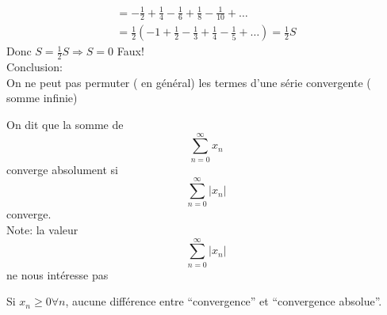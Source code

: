 \documentclass[../main.tex]{subfiles}
\begin{document}
\begin{align*}
= -\frac{1}{2} + \frac{1}{4} - \frac{1}{6} + \frac{1}{8} - \frac{1}{10}  + \ldots\\
= \frac{1}{2} ( -1 + \frac{1}{2} - \frac{1}{3} + \frac{1}{4} - \frac{1}{5} + \ldots) = \frac{1}{2} S
\end{align*}
Donc $S = \frac{1}{2}S \Rightarrow S =0$ Faux!\\
Conclusion:\\
On ne peut pas permuter ( en général) les termes d'une série convergente ( somme infinie)
\begin{defn}
On dit que la somme de 
\[ 
\sum_{n=0}^{ \infty} x_n
\]
converge absolument si 
\[ 
\sum_{n=0}^{ \infty} | x_n|
\]
converge.\\
Note: la valeur 
\[ 
\sum_{n=0}^{ \infty} |x_n | 
\]
ne nous intéresse pas
\end{defn}
\begin{rmq}
Si $x_n \geq 0 \forall n$, aucune différence entre ``convergence'' et ``convergence absolue''.
\end{rmq}
\end{document}
